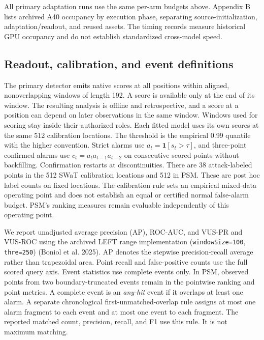 \documentclass[
  american,
]{article}
\begin{document}
All primary adaptation runs use the same per-arm budgets above. Appendix
B lists archived A40 occupancy by execution phase, separating
source-initialization, adaptation/readout, and reused assets. The timing
records measure historical GPU occupancy and do not establish
standardized cross-model speed.

\subsection{Readout, calibration, and event
definitions}\label{readout-calibration-and-event-definitions}

The primary detector emits native scores at all positions within
aligned, nonoverlapping windows of length 192. A score is available only
at the end of its window. The resulting analysis is offline and
retrospective, and a score at a position can depend on later
observations in the same window. Windows used for scoring stay inside
their authorized roles. Each fitted model uses its own scores at the
same 512 calibration locations. The threshold is the empirical 0.99
quantile with the higher convention. Strict alarms use
\(a_t=\mathbf{1}[s_t>\tau]\), and three-point confirmed alarms use
\(c_t=a_t a_{t-1}a_{t-2}\) on consecutive scored points without
backfilling. Confirmation restarts at discontinuities. There are 38
attack-labeled points in the 512 SWaT calibration locations and 512 in
PSM. These are post hoc label counts on fixed locations. The calibration
rule sets an empirical mixed-data operating point and does not establish
an equal or certified normal false-alarm budget. PSM's ranking measures
remain evaluable independently of this operating point.

We report unadjusted average precision (AP), ROC-AUC, and VUS-PR and
VUS-ROC using the archived LEFT range implementation
(\texttt{windowSize=100}, \texttt{thre=250}) (Boniol et al. 2025). AP
denotes the stepwise precision-recall average rather than trapezoidal
area. Point recall and false-positive counts use the full scored query
axis. Event statistics use complete events only. In PSM, observed points
from two boundary-truncated events remain in the pointwise ranking and
point metrics. A complete event is an \emph{any-hit} event if it
overlaps at least one alarm. A separate chronological
first-unmatched-overlap rule assigns at most one alarm fragment to each
event and at most one event to each fragment. The reported matched
count, precision, recall, and F1 use this rule. It is not maximum
matching.
\end{document}
